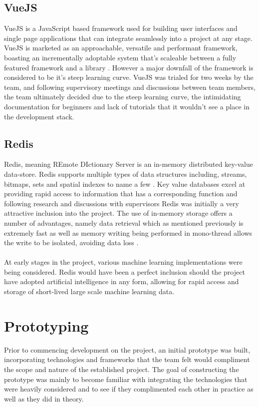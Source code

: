 \subsection{VueJS}
VueJS is a JavaScript based framework used for building user interfaces and single page applications that can integrate seamlessly into a project at any stage. VueJS is marketed as an approachable, versatile and performant framework, boasting an incrementally adoptable system that's scaleable between a fully featured framework and a library \cite{VUE}. However a major downfall of the framework is considered to be it's steep learning curve. VueJS was trialed for two weeks by the team, and following supervisory meetings and discussions between team members, the team ultimately decided due to the steep learning curve, the intimidating documentation for beginners and lack of tutorials that it wouldn't see a place in the development stack.

\subsection{Redis}
Redis, meaning REmote DIctionary Server is an in-memory distributed key-value data-store. Redis supports multiple types of data structures including, streams, bitmaps, sets and spatial indexes to name a few \cite{REDIS_IO}. Key value databases excel at providing rapid access to information that has a corresponding function and following research and discussions with supervisors Redis was initially a very attractive inclusion into the project. The use of in-memory storage offers a number of advantages, namely data retrieval which as mentioned previously is extremely fast as well as memory writing being performed in mono-thread allows the write to be isolated, avoiding data loss \cite{REDIS}.

\paragraph{}
At early stages in the project, various machine learning implementations were being considered. Redis would have been a perfect inclusion should the project have adopted artificial intelligence in any form, allowing for rapid access and storage of short-lived large scale machine learning data.

\section{Prototyping}
Prior to commencing development on the project, an initial prototype was built, incorporating technologies and frameworks that the team felt would compliment the scope and nature of the established project. The goal of constructing the prototype was mainly to become familiar with integrating the technologies that were heavily considered and to see if they complimented each other in practice as well as they did in theory.

